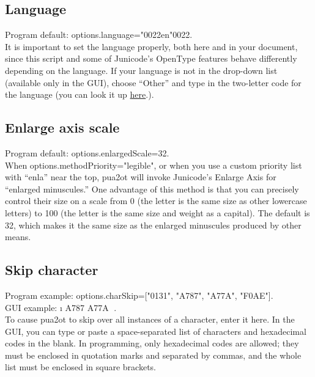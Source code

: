 \documentclass[12pt,letterpaper,openany]{article}
\newcommand\textSourceText[1]{{\color{GGOrange}\textsf{#1}}}
\newcommand{\pto}{\textsf{\color{myLightPurple}pua2ot}}
\begin{document}
\subsection{Language}

Program default: \textSourceText{options.language=\char"0022en\char"0022}.\\
It is important to set the language properly, both here and in your document, since this script
and some of Junicode’s OpenType features behave differently depending on the language. If your 
language is not in the drop-down list (available
only in the GUI), choose “Other” and type in the two-letter code for the language (you can look
it up \href{https://www.w3schools.com/tags/ref_language_codes.asp}{here}.).

\subsection{Enlarge axis scale}

Program default: \textSourceText{options.enlargedScale=32}.\\
When \textSourceText{options.methodPriority="legible"}, or when you use a custom priority list 
with \textSourceText{“enla”} near the top, {\pto} will invoke Junicode’s Enlarge Axis for 
“enlarged minuscules.” One advantage of this method is that you can precisely control their 
size on a scale from 0 (the letter is the same size as other lowercase letters) to 100 (the
letter is the same size and weight as a capital). The default is 32, which makes it the same 
size as the enlarged minuscules produced by other means.

\subsection{Skip character}

Program example: \textSourceText{options.charSkip=["0131", "A787", "A77A", "F0AE"]}.\\
GUI example: \textSourceText{\jRegular ı A787 A77A }.\\
To cause {\pto} to skip over all instances 
of a character, enter it here. In the GUI, you can type or paste a space-separated 
list of characters and hexadecimal codes in the blank. In programming, only hexadecimal 
codes are allowed; they must be
enclosed in quotation marks and separated by commas, and the whole list must be enclosed in 
square brackets.
\end{document}
